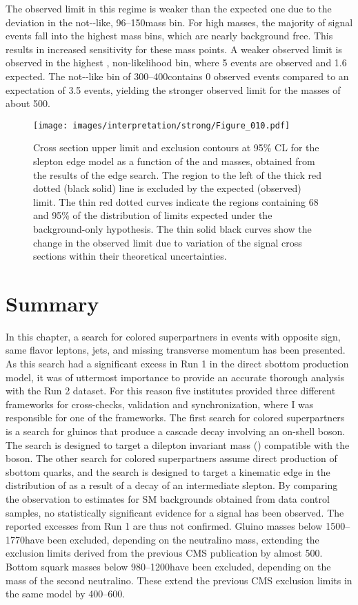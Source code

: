The observed limit in this regime is weaker than the expected one due to the deviation in the not-\ttbar-like, 96--150\GeV mass bin.
For high \secondchi masses, the majority of signal events fall into the highest mass bins, which are nearly background free. 
This results in increased sensitivity for these mass points. 
A weaker observed limit is observed in the highest \mll, non-\ttbar likelihood bin, where 5 events are observed and 1.6 expected.   
The not-\ttbar-like \mll bin of 300--400\GeV contains 0 observed events compared to an expectation of 3.5 events, yielding the stronger observed limit for the \secondchi masses of about 500\GeV.
\begin{figure}
  \centering
    \texttt{[image: images/interpretation/strong/Figure\_010.pdf]}
    \caption{Cross section upper limit and exclusion contours at 95\% CL for the slepton edge model as a function of the \sbottom and \secondchi masses, obtained from the results of the edge search.
The region to the left of the thick red dotted (black solid) line is excluded by the expected (observed) limit.
The thin red dotted curves indicate the regions containing 68 and 95\% of the distribution of limits expected under the background-only hypothesis.
The thin solid black curves show the change in the observed limit due to variation of the signal cross sections within their theoretical uncertainties.
} 
\label{fig:Limits2}
\end{figure}
\section{Summary}
\noindent\justify
In this chapter, a search for colored superpartners in events with opposite sign, same flavor leptons, jets, and missing transverse momentum has been presented. 
As this search had a significant excess in Run 1 in the direct sbottom production model, it was of uttermost importance to provide an accurate thorough analysis with the Run 2 dataset. 
For this reason five institutes provided three different frameworks for cross-checks, validation and synchronization, where I was responsible for one of the frameworks.  
\newpara
\noindent\justify
The first search for colored superpartners is a search for gluinos that produce a cascade decay involving an on-shell \PZ boson. 
The search is designed to target a dilepton invariant mass (\mll) compatible with the \PZ boson. 
The other search for colored superpartners assume direct production of sbottom quarks, and the search is designed to target a kinematic edge in the distribution of \mll as a result of a decay of an intermediate slepton.
By comparing the observation to estimates for SM backgrounds obtained from data control samples, no statistically significant evidence for a signal has been observed.
The reported excesses from Run 1 are thus not confirmed. 
\newpara
\noindent\justify
Gluino masses below 1500--1770\GeV have been excluded, depending on the neutralino mass, extending the exclusion limits derived from the previous CMS publication by almost 500\GeV.
Bottom squark masses below 980--1200\GeV have been excluded, depending on the mass of the second neutralino.
These extend the previous CMS exclusion limits in the same model by 400--600\GeV.
